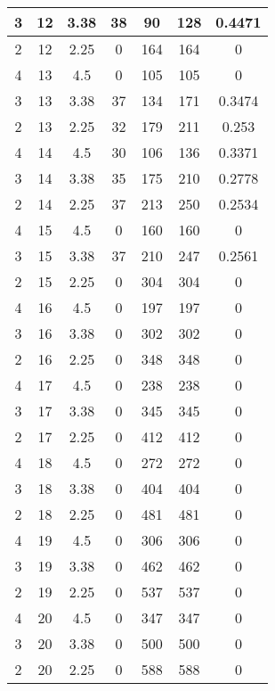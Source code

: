 \documentclass[letterpaper, 12pt]{article}
\begin{document}
\begin{longtable}{|c|c|c|c|c|c|c|}
\hline
3 & 12 & 3.38 & 38 & 90 & 128 & 0.4471 \\
\hline
2 & 12 & 2.25 & 0 & 164 & 164 & 0 \\
\hline
4 & 13 & 4.5 & 0 & 105 & 105 & 0 \\
\hline
3 & 13 & 3.38 & 37 & 134 & 171 & 0.3474 \\
\hline
2 & 13 & 2.25 & 32 & 179 & 211 & 0.253 \\
\hline
4 & 14 & 4.5 & 30 & 106 & 136 & 0.3371 \\
\hline
3 & 14 & 3.38 & 35 & 175 & 210 & 0.2778 \\
\hline
2 & 14 & 2.25 & 37 & 213 & 250 & 0.2534 \\
\hline
4 & 15 & 4.5 & 0 & 160 & 160 & 0 \\
\hline
3 & 15 & 3.38 & 37 & 210 & 247 & 0.2561 \\
\hline
2 & 15 & 2.25 & 0 & 304 & 304 & 0 \\
\hline
4 & 16 & 4.5 & 0 & 197 & 197 & 0 \\
\hline
3 & 16 & 3.38 & 0 & 302 & 302 & 0 \\
\hline
2 & 16 & 2.25 & 0 & 348 & 348 & 0 \\
\hline
4 & 17 & 4.5 & 0 & 238 & 238 & 0 \\
\hline
3 & 17 & 3.38 & 0 & 345 & 345 & 0 \\
\hline
2 & 17 & 2.25 & 0 & 412 & 412 & 0 \\
\hline
4 & 18 & 4.5 & 0 & 272 & 272 & 0 \\
\hline
3 & 18 & 3.38 & 0 & 404 & 404 & 0 \\
\hline
2 & 18 & 2.25 & 0 & 481 & 481 & 0 \\
\hline
4 & 19 & 4.5 & 0 & 306 & 306 & 0 \\
\hline
3 & 19 & 3.38 & 0 & 462 & 462 & 0 \\
\hline
2 & 19 & 2.25 & 0 & 537 & 537 & 0 \\
\hline
4 & 20 & 4.5 & 0 & 347 & 347 & 0 \\
\hline
3 & 20 & 3.38 & 0 & 500 & 500 & 0 \\
\hline
2 & 20 & 2.25 & 0 & 588 & 588 & 0 \\
\hline
\end{longtable}
\end{document}
